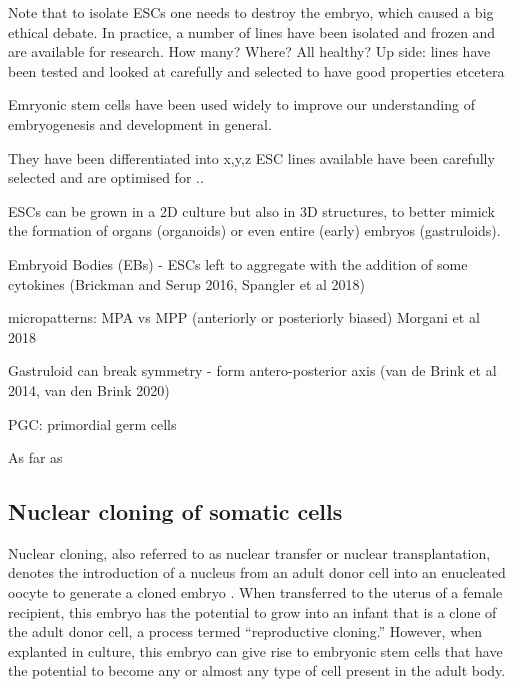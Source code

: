 Note that to isolate ESCs one needs to destroy the embryo, which caused a big ethical debate.
In practice, a number of lines have been isolated and frozen and are available for research.
How many? Where? All healthy?
Up side: lines have been tested and looked at carefully and selected to have good properties etcetera

Emryonic stem cells have been used widely to improve our understanding of embryogenesis and development in general. 

They have been differentiated into x,y,z
ESC lines available have been carefully selected and are optimised for ..

ESCs can be grown in a 2D culture but also in 3D structures, to better mimick the formation of organs (organoids) or even entire (early) embryos (gastruloids).

Embryoid Bodies (EBs) - ESCs left to aggregate with the addition of some cytokines (Brickman and Serup 2016, Spangler et al 2018)

micropatterns: MPA vs MPP (anteriorly or posteriorly biased)
Morgani et al 2018

Gastruloid can break symmetry - form antero-posterior axis (van de Brink et al 2014, van den Brink 2020)

PGC: primordial germ cells

As far as 

\subsection{Nuclear cloning of somatic cells}

Nuclear cloning, also referred to as nuclear transfer or nuclear transplantation, denotes the introduction of a nucleus from an adult donor cell into an enucleated oocyte to generate a cloned embryo \cite{hochedlinger2003nuclear}.
When transferred to the uterus of a female recipient, this embryo has the potential to grow into an infant that is a clone of the adult donor cell, a process termed “reproductive cloning.” 
However, when explanted in culture, this embryo can give rise to embryonic stem cells that have the potential to become any or almost any type of cell present in the adult body.\\

